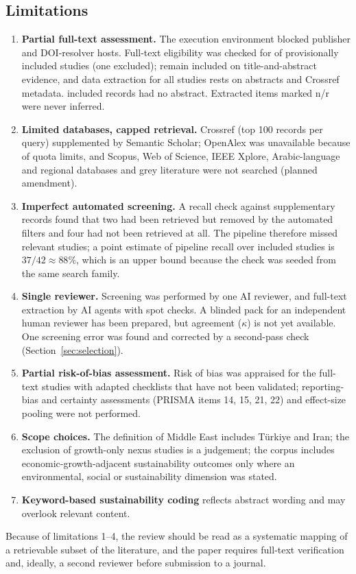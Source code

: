 \documentclass[11pt,a4paper]{article}
\begin{document}
\subsection{Limitations}\label{sec:limits}
\begin{enumerate}
\item \textbf{Partial full-text assessment.} The execution environment blocked publisher and DOI-resolver hosts. Full-text eligibility was checked for \Nftretr{} of \Nftsought{} provisionally included studies (one excluded); \Nabsonly{} remain included on title-and-abstract evidence, and data extraction for all studies rests on abstracts and Crossref metadata. \Nnnoabs{} included records had no abstract. Extracted items marked n/r were never inferred.
\item \textbf{Limited databases, capped retrieval.} Crossref (top 100 records per query) supplemented by Semantic Scholar; OpenAlex was unavailable because of quota limits, and Scopus, Web of Science, IEEE Xplore, Arabic-language and regional databases and grey literature were not searched (planned amendment).
\item \textbf{Imperfect automated screening.} A recall check against \Nother{} supplementary records found that two had been retrieved but removed by the automated filters and four had not been retrieved at all. The pipeline therefore missed relevant studies; a point estimate of pipeline recall over included studies is $37/42\approx 88\%$, which is an upper bound because the check was seeded from the same search family.
\item \textbf{Single reviewer.} Screening was performed by one AI reviewer, and full-text extraction by AI agents with spot checks. A blinded pack for an independent human reviewer has been prepared, but agreement ($\kappa$) is not yet available. One screening error was found and corrected by a second-pass check (Section~\ref{sec:selection}).
\item \textbf{Partial risk-of-bias assessment.} Risk of bias was appraised for the \Nftconf{} full-text studies with adapted checklists that have not been validated; reporting-bias and certainty assessments (PRISMA items 14, 15, 21, 22) and effect-size pooling were not performed.
\item \textbf{Scope choices.} The definition of Middle East includes T\"urkiye and Iran; the exclusion of growth-only nexus studies is a judgement; the corpus includes economic-growth-adjacent sustainability outcomes only where an environmental, social or sustainability dimension was stated.
\item \textbf{Keyword-based sustainability coding} reflects abstract wording and may overlook relevant content.
\end{enumerate}
Because of limitations 1--4, the review should be read as a systematic mapping of a retrievable subset of the literature, and the paper requires full-text verification and, ideally, a second reviewer before submission to a journal.
\end{document}

